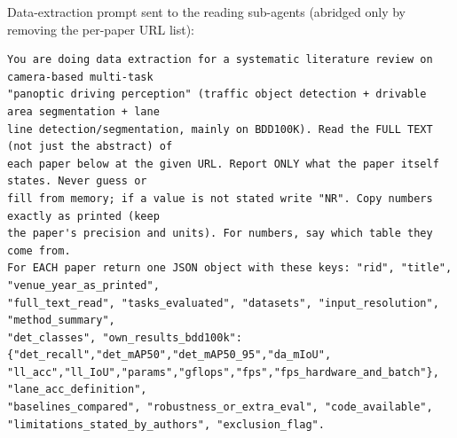Data-extraction prompt sent to the reading sub-agents (abridged only by removing the per-paper URL list):
\begin{lstlisting}
You are doing data extraction for a systematic literature review on camera-based multi-task
"panoptic driving perception" (traffic object detection + drivable area segmentation + lane
line detection/segmentation, mainly on BDD100K). Read the FULL TEXT (not just the abstract) of
each paper below at the given URL. Report ONLY what the paper itself states. Never guess or
fill from memory; if a value is not stated write "NR". Copy numbers exactly as printed (keep
the paper's precision and units). For numbers, say which table they come from.
For EACH paper return one JSON object with these keys: "rid", "title", "venue_year_as_printed",
"full_text_read", "tasks_evaluated", "datasets", "input_resolution", "method_summary",
"det_classes", "own_results_bdd100k": {"det_recall","det_mAP50","det_mAP50_95","da_mIoU",
"ll_acc","ll_IoU","params","gflops","fps","fps_hardware_and_batch"}, "lane_acc_definition",
"baselines_compared", "robustness_or_extra_eval", "code_available",
"limitations_stated_by_authors", "exclusion_flag".
\end{lstlisting}
